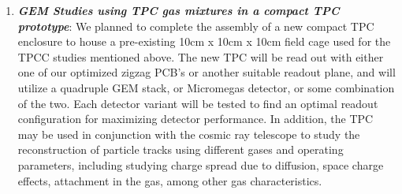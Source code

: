 \begin{enumerate}
\item	\textbf{\emph{GEM Studies using TPC gas mixtures in a compact TPC prototype}}: We planned to complete the assembly of a new compact TPC enclosure to house a pre-existing 10cm x 10cm x 10cm field cage used for the TPCC studies mentioned above. The new TPC will be read out with either one of our optimized zigzag PCB’s or another suitable readout plane, and will utilize a quadruple GEM stack, or Micromegas detector, or some combination of the two. Each detector variant will be tested to find an optimal readout configuration for maximizing detector performance. In addition, the TPC may be used in conjunction with the cosmic ray telescope to study the reconstruction of particle tracks using different gases and operating parameters, including studying charge spread due to diffusion, space charge effects, attachment in the gas, among other gas characteristics. 


\end{enumerate}